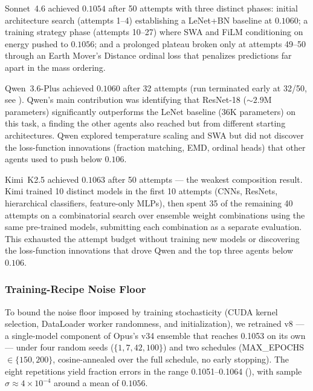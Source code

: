 \documentclass[universe,article,submit,pdftex,oneauthor]{Definitions/mdpi}
\begin{document}
Sonnet~4.6 achieved $0.1054$ after 50 attempts with three distinct phases: initial architecture search (attempts 1--4) establishing a LeNet+BN baseline at $0.1060$; a training strategy phase (attempts 10--27) where SWA and FiLM conditioning on energy pushed to $0.1056$; and a prolonged plateau broken only at attempts 49--50 through an Earth Mover's Distance ordinal loss that penalizes predictions far apart in the mass ordering.

Qwen~3.6-Plus achieved $0.1060$ after 32 attempts (run terminated early at 32/50, see ). Qwen's main contribution was identifying that ResNet-18 (${\sim}2.9$M parameters) significantly outperforms the LeNet baseline ($36$K parameters) on this task, a finding the other agents also reached but from different starting architectures. Qwen explored temperature scaling and SWA but did not discover the loss-function innovations (fraction matching, EMD, ordinal heads) that other agents used to push below $0.106$.

Kimi~K2.5 achieved $0.1063$ after 50 attempts --- the weakest composition result. Kimi trained 10 distinct models in the first 10 attempts (CNNs, ResNets, hierarchical classifiers, feature-only MLPs), then spent 35 of the remaining 40 attempts on a combinatorial search over ensemble weight combinations using the same pre-trained models, submitting each combination as a separate evaluation. This exhausted the attempt budget without training new models or discovering the loss-function innovations that drove Qwen and the top three agents below $0.106$.

\subsubsection{Training-Recipe Noise Floor}
\label{sec:comp_noise_floor}

To bound the noise floor imposed by training stochasticity (CUDA kernel selection, DataLoader worker randomness, and initialization), we retrained v8 --- a single-model component of Opus's v34 ensemble that reaches 0.1053 on its own --- under four random seeds ($\{1, 7, 42, 100\}$) and two schedules (MAX\_EPOCHS $\in \{150, 200\}$, cosine-annealed over the full schedule, no early stopping). The eight repetitions yield fraction errors in the range 0.1051--0.1064 (), with sample $\sigma \approx 4 \times 10^{-4}$ around a mean of $0.1056$.
\end{document}
